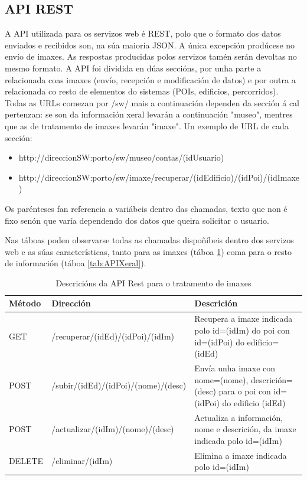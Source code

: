 \subsection{API REST}
A API utilizada para os servizos web é REST, polo que o formato dos datos enviados e recibidos son, na súa maioría JSON. A única excepción prodúcese no envío de imaxes. As respostas producidas polos servizos tamén serán devoltas no mesmo formato.
A API foi dividida en dúas seccións, por unha parte a relacionada coas imaxes (envío, recepción e modificación de datos) e por outra a relacionada co resto de elementos do sistemas (POIs, edificios, percorridos).
Todas as URLs comezan por /sw/ mais a continuación dependen da sección á cal pertenzan: se son da información xeral levarán a continuación "museo", mentres que as de tratamento de imaxes levarán "imaxe". Un exemplo de URL de cada sección:

\begin{itemize}
	\item http://direccionSW:porto/sw/museo/contas/(idUsuario)
	\item http://direccionSW:porto/sw/imaxe/recuperar/(idEdificio)/(idPoi)/(idImaxe)
\end{itemize}

Os parénteses fan referencia a variábeis dentro das chamadas, texto que non é fixo senón que varía dependendo dos datos que queira solicitar o usuario.

Nas táboas poden observarse todas as chamadas dispoñíbeis dentro dos servizos web e as súas características, tanto para as imaxes (táboa \ref{tab:APIImaxes}) coma para o resto de información (táboa \ref{tab:APIXeral}).

\begin{table} [tbp]
	\begin{tabular}{|l|p{6cm}|p{6cm}|}
		\hline 
		\textbf{Método}	& \textbf{Dirección} & \textbf{Descrición} \\ 
		\hline 
		GET & /recuperar/(idEd)/(idPoi)/(idIm) & Recupera a imaxe indicada polo id=(idIm) do poi con id=(idPoi) do edificio=(idEd) \\ 
		\hline 
		POST & /subir/(idEd)/(idPoi)/(nome)/(desc) & Envía unha imaxe con nome=(nome), descrición=(desc) para o poi con id=(idPoi) do edificio (idEd) \\ 
		\hline 
		POST & /actualizar/(idIm)/(nome)/(desc) & Actualiza a información, nome e descrición, da imaxe indicada polo id=(idIm) \\ 
		\hline 
		DELETE & /eliminar/(idIm) & Elimina a imaxe indicada polo id=(idIm) \\ 
		\hline 
	\end{tabular}
	\caption{Descricións da API Rest para o tratamento de imaxes}
	\label{tab:APIImaxes}
\end{table}

